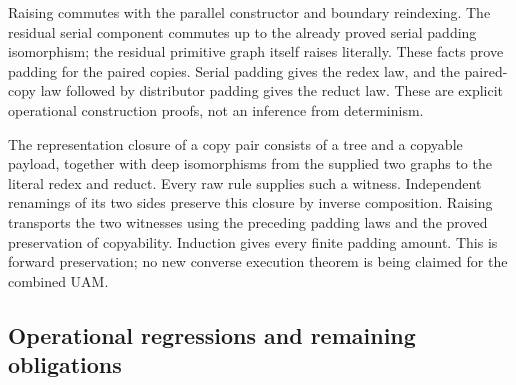 





Raising commutes with the parallel constructor and boundary reindexing.
The residual serial component commutes up to the already proved serial
padding isomorphism; the residual primitive graph itself raises literally.
These facts prove padding for the paired copies. Serial padding gives the
redex law, and the paired-copy law followed by distributor padding gives the
reduct law. These are explicit operational construction proofs, not an
inference from determinism.




The representation closure of a copy pair consists of a tree and a copyable
payload, together with deep isomorphisms from the supplied two graphs to the
literal redex and reduct. Every raw rule supplies such a witness. Independent
renamings of its two sides preserve this closure by inverse composition.
Raising transports the two witnesses using the preceding padding laws and
the proved preservation of copyability. Induction gives every finite padding
amount. This is forward preservation; no new converse execution theorem is
being claimed for the combined UAM.






\subsection{Operational regressions and remaining obligations}

